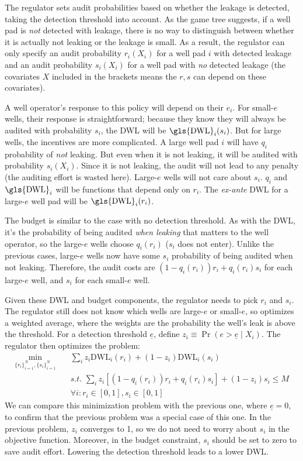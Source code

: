 The regulator sets audit probabilities based on whether the leakage is detected, taking
the detection threshold into account.
As the game tree suggests, if a well pad is \textit{not} detected with leakage, there is no way to distinguish between whether it is actually not leaking or the leakage is small.
As a result, the regulator can only specify an audit probability \(r_i(X_i)\) for a well pad \(i\) with detected leakage and an audit probability \(s_i(X_i)\) for a well pad with \textit{no} detected leakage (the covariates \(X\) included in the brackets means the \(r,s\) can depend on these covariates).

A well operator's response to this policy will depend on their \(e_i\).
For small-\(e\) wells, their response is straightforward; because they know they will always be audited with probability \(s_i\), the \gls{DWL} will be \(\text{\gls{DWL}}_i(s_i)\).
But for large wells, the incentives are more complicated.
A large well pad \(i\) will have \(q_i\) probability of \textit{not} leaking.
But even when it is not leaking, it will be audited with probability \(s_i(X_i)\).
Since it is not leaking, the audit will not lead to any penalty
(the auditing effort is wasted here).
Large-\(e\) wells will not care about \(s_i\).
\(q_i\) and \(\text{\gls{DWL}}_i\) will be functions that depend only on \(r_i\).
The \textit{ex-ante} \gls{DWL} for a large-\(e\) well pad will be
\(\text{\gls{DWL}}_i(r_i)\).

The budget is similar to the case with no detection threshold.
As with the \gls{DWL}, it's the probability of being audited \emph{when leaking} that matters to the well operator, so the large-\(e\) wells choose \(q_i(r_i)\) (\(s_i\) does not enter).
Unlike the previous cases, large-\(e\) wells now have some \(s_i\) probability of being audited when not leaking.
Therefore, the audit costs are \((1 - q_i(r_i)) r_i + q_i(r_i) s_i\) for each large-\(e\) well, and \(s_i\) for each small-\(e\) well.

Given these \gls{DWL} and budget components, the regulator needs to pick \(r_i\) and \(s_i\).
The regulator still does not know which wells are large-\(e\) or small-\(e\), so optimizes a weighted average, where the weights are the probability the well's leak is above the threshold.
For a detection threshold \(\underline{e}\), define
\(z_i \equiv \Pr(e > \underline{e} \mid X_i)\).
The regulator then optimizes the problem:
\begin{align*}
\min_{
\{r_i\}_{i = 1} ^ N, \{s_i\}_{i = 1} ^ N
} \quad &
\sum_i
z_i  \text{DWL}_i(r_i) +
(1 - z_i ) \text{DWL}_i(s_i)\\
&\textit{s.t. }
\sum_i
z_i [(1 - q_i(r_i)) r_i + q_i(r_i) s_i] +
(1 - z_i) s_i
\leq M\\
&\forall i: r_i \in [0, 1], s_i \in [0, 1]
\end{align*}
We can compare this minimization problem with the previous one, where \(\underline{e} = 0\), to confirm that the previous problem was a special case of this one.
In the previous problem, \(z_i\) converges to 1, so we do not need to worry about \(s_i\) in the objective function.
Moreover, in the budget constraint, \(s_i\) should be set to zero to save audit effort.
Lowering the detection threshold leads to a lower \gls{DWL}.


